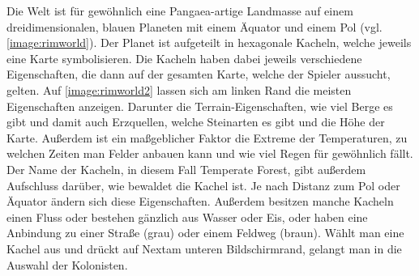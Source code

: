 Die Welt ist für gewöhnlich eine Pangaea-artige Landmasse auf einem dreidimensionalen, blauen Planeten mit einem Äquator und einem Pol (vgl. \autoref{image:rimworld}). Der Planet ist aufgeteilt in hexagonale Kacheln, welche jeweils eine Karte symbolisieren. Die Kacheln haben dabei jeweils verschiedene Eigenschaften, die dann auf der gesamten Karte, welche der Spieler aussucht, gelten. Auf \autoref{image:rimworld2} lassen sich am linken Rand die meisten Eigenschaften anzeigen. Darunter die Terrain-Eigenschaften, wie viel Berge es gibt und damit auch Erzquellen, welche Steinarten es gibt und die Höhe der Karte. Außerdem ist ein maßgeblicher Faktor die Extreme der Temperaturen, zu welchen Zeiten man Felder anbauen kann und wie viel Regen für gewöhnlich fällt. Der Name der Kacheln, in diesem Fall \glqq Temperate Forest\grqq, gibt außerdem Aufschluss darüber, wie bewaldet die Kachel ist. Je nach Distanz zum Pol oder Äquator ändern sich diese Eigenschaften. Außerdem besitzen manche Kacheln einen Fluss oder bestehen gänzlich aus Wasser oder Eis, oder haben eine Anbindung zu einer Straße (grau) oder einem Feldweg (braun). Wählt man eine Kachel aus und drückt auf \glqq Next\grqq\;am unteren Bildschirmrand, gelangt man in die Auswahl der Kolonisten.

